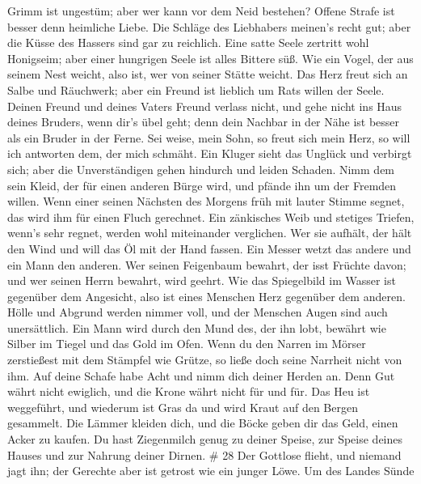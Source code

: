 Grimm ist ungestüm; aber wer kann vor dem Neid bestehen? 
Offene Strafe ist besser denn heimliche Liebe.  Die Schläge
des Liebhabers meinen's recht gut; aber die Küsse des Hassers sind gar
zu reichlich.  Eine satte Seele zertritt wohl Honigseim;
aber einer hungrigen Seele ist alles Bittere süß.  Wie ein
Vogel, der aus seinem Nest weicht, also ist, wer von seiner Stätte
weicht.  Das Herz freut sich an Salbe und Räuchwerk; aber
ein Freund ist lieblich um Rats willen der Seele.  Deinen
Freund und deines Vaters Freund verlass nicht, und gehe nicht ins Haus
deines Bruders, wenn dir's übel geht; denn dein Nachbar in der Nähe ist
besser als ein Bruder in der Ferne.  Sei weise, mein Sohn,
so freut sich mein Herz, so will ich antworten dem, der mich schmäht.
 Ein Kluger sieht das Unglück und verbirgt sich; aber die
Unverständigen gehen hindurch und leiden Schaden.  Nimm dem
sein Kleid, der für einen anderen Bürge wird, und pfände ihn um der
Fremden willen.  Wenn einer seinen Nächsten des Morgens
früh mit lauter Stimme segnet, das wird ihm für einen Fluch gerechnet.
 Ein zänkisches Weib und stetiges Triefen, wenn's sehr
regnet, werden wohl miteinander verglichen.  Wer sie
aufhält, der hält den Wind und will das Öl mit der Hand fassen.
 Ein Messer wetzt das andere und ein Mann den anderen.
 Wer seinen Feigenbaum bewahrt, der isst Früchte davon; und
wer seinen Herrn bewahrt, wird geehrt.  Wie das Spiegelbild
im Wasser ist gegenüber dem Angesicht, also ist eines Menschen Herz
gegenüber dem anderen.  Hölle und Abgrund werden nimmer
voll, und der Menschen Augen sind auch unersättlich.  Ein
Mann wird durch den Mund des, der ihn lobt, bewährt wie Silber im Tiegel
und das Gold im Ofen.  Wenn du den Narren im Mörser
zerstießest mit dem Stämpfel wie Grütze, so ließe doch seine Narrheit
nicht von ihm.  Auf deine Schafe habe Acht und nimm dich
deiner Herden an.  Denn Gut währt nicht ewiglich, und die
Krone währt nicht für und für.  Das Heu ist weggeführt, und
wiederum ist Gras da und wird Kraut auf den Bergen gesammelt.
 Die Lämmer kleiden dich, und die Böcke geben dir das Geld,
einen Acker zu kaufen.  Du hast Ziegenmilch genug zu deiner
Speise, zur Speise deines Hauses und zur Nahrung deiner Dirnen. \# 28
 Der Gottlose flieht, und niemand jagt ihn; der Gerechte
aber ist getrost wie ein junger Löwe.  Um des Landes Sünde
